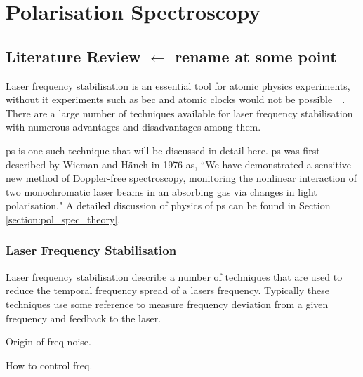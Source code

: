 \chapter{Polarisation Spectroscopy}
\setcounter{page}{1}

\section{Literature Review $\leftarrow$ rename at some point}

Laser frequency stabilisation is an essential tool for atomic physics experiments, without it experiments such as \gls{bec} and atomic clocks would not be possible~~\cite{anderson_observation_1995,ye_quantum_2008}.
There are a large number of techniques available for laser frequency stabilisation with numerous advantages and disadvantages among them.

\Gls{ps} is one such technique that will be discussed in detail here.
\Gls{ps} was first described by Wieman and H\"anch in 1976 as, ``We have demonstrated a sensitive new method of Doppler-free spectroscopy, monitoring the nonlinear interaction of two monochromatic laser beams in an absorbing gas via changes in light polarisation."\cite{wieman_doppler-free_1976}
A detailed discussion of physics of \gls{ps} can be found in Section \ref{section:pol_spec_theory}.

\subsection{Laser Frequency Stabilisation}

Laser frequency stabilisation describe a number of techniques that are used to reduce the temporal frequency spread of a lasers frequency.
Typically these techniques use some reference to measure frequency deviation from a given frequency and feedback to the laser.

Origin of freq noise.

How to control freq.

